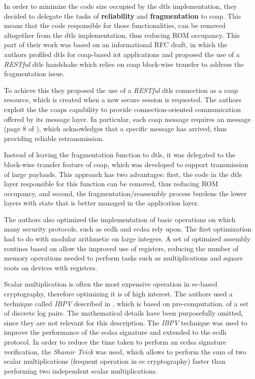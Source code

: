 \documentclass{llncs}
\begin{document}
In order to minimize the code size occupied by the \gls{dtls} implementation, they
decided to delegate the tasks of \textbf{reliability} and \textbf{fragmentation} to
\gls{coap}. This means that the code responsible for those functionalities,
can be removed altogether from the \gls{dtls} implementation, thus reducing ROM
occupancy. This part of their work was based on an informational RFC draft\cite{I-D.keoh-dtls-profile-iot}, in which the
authors profiled \gls{dtls} for \gls{coap}-based \gls{iot} applications and proposed
the use of a \textit{RESTful} \gls{dtls} handshake which relies on \gls{coap} block-wise
transfer to address the fragmentation issue.

To achieve this they  proposed the use of a \textit{RESTful} \gls{dtls} connection as a \gls{coap} resource,
which is created when a new secure session is requested.
The authors exploit the the \gls{coap}s capability to provide connection-oriented
communication offered by its message layer. In particular, each 
\gls{coap} message requires an  message (page 8 of  \cite{RFC7252}),
which acknowledges that a specific  message has arrived, thus
providing reliable retransmission.

Instead of leaving the fragmentation function to \gls{dtls}, it was
delegated to the block-wise transfer feature of \gls{coap}\cite{RFC7959}, which was developed
to support transmission of large payloads. This approach has two advantages: first, the code in the \gls{dtls}
layer responsible for this function can be removed, thus reducing ROM occupancy,
and second, the fragmentation/reassembly process burdens the lower layers
with state that is better managed in the application layer.

The authors also optimized the implementation of basic operations on which
many security protocols, such as \gls{ecdh} and \gls{ecdsa} rely upon. The first
optimization had to do with modular arithmetic on large integers. A set of optimized
assembly routines based on \cite{Comparin25:Online} allow the improved use of
registers, reducing the number of memory operations needed to perform
tasks such as multiplications and square roots on devices with  registers.

Scalar multiplication is often the most expensive operation in \gls{ec}-based
cryptography, therefore optimizing it is of high interest. The authors used a
technique called \textit{IBPV} described in \cite{LowcostS87:online}, which is based on pre-computation.
of a set of discrete log pairs. The mathematical details have been purposefully omitted,
since they are not relevant for this description. The \textit{IBPV} technique was used
to improve the performance of the \gls{ecdsa} signature and extended to the
\gls{ecdh} protocol. In order to reduce the time taken to perform an \gls{ecdsa}
signature verification, the \textit{Shamir Trick} was used, which allows
to perform the sum of two scalar multiplications (frequent operation in \gls{ec} cryptography)
faster than performing two independent scalar multiplications.
\end{document}
